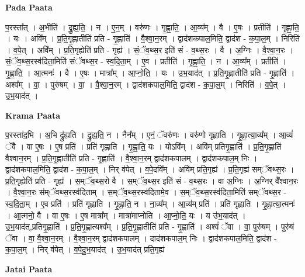 \documentclass[17pt]{extarticle}
\begin{document}
\textbf{Pada Paata} \newline

प॒रस्ता᳚त् । अ॒भीति॑ । द्रु॒ह्य॒ति॒ । न । ए॒न॒म् । वरु॑णः । गृ॒ह्णा॒ति॒ । आ॒व्य᳚म् । वै । ए॒षः । प्रतीति॑ । गृ॒ह्णा॒ति॒ । यः । अवि᳚म् । प्र॒ति॒गृ॒ह्णातीति॑ प्रति - गृ॒ह्णाति॑ । वै॒श्वा॒न॒रम् । द्वाद॑शकपाल॒मिति॒ द्वाद॑श - क॒पा॒ल॒म् । निरिति॑ । व॒पे॒त् । अवि᳚म् । प्र॒ति॒गृह्येति॑ प्रति - गृह्य॑ । सं॒ॅव॒थ्स॒र इति॑ सं - व॒थ्स॒रः । वै । अ॒ग्निः । वै॒श्वा॒न॒रः । सं॒ॅव॒थ्स॒रस्व॑दिता॒मिति॑ संॅवथ्स॒र - स्व॒दि॒ता॒म् । ए॒व । प्रतीति॑ । गृ॒ह्णा॒ति॒ । न । आ॒व्य᳚म् । प्रतीति॑ । गृ॒ह्णा॒ति॒ । आ॒त्मनः॑ । वै । ए॒षः । मात्रा᳚म् । आ॒प्नो॒ति॒ । यः । उ॒भ॒याद॑त् । प्र॒ति॒गृ॒ह्णातीति॑ प्रति - गृ॒ह्णाति॑ । अश्व᳚म् । वा॒ । पुरु॑षम् । वा॒ । वै॒श्वा॒न॒रम् । द्वाद॑शकपाल॒मिति॒ द्वाद॑श - क॒पा॒ल॒म् । निरिति॑ । व॒पे॒त् । उ॒भ॒याद॑त् ।  \newline


\textbf{Krama Paata} \newline

प॒रस्ता॑द॒भि । अ॒भि द्रु॑ह्यति । द्रु॒ह्य॒ति॒ न । नैन᳚म् । ए॒नं॒ ॅवरु॑णः । वरु॑णो गृह्णाति । गृ॒ह्णा॒त्या॒व्य᳚म् । आ॒व्यं॑ ॅवै । वा ए॒षः । ए॒ष प्रति॑ । प्रति॑ गृह्णाति । गृ॒ह्णा॒ति॒ यः । योऽवि᳚म् । अवि॑म् प्रतिगृ॒ह्णाति॑ । प्र॒ति॒गृ॒ह्णाति॑ वैश्वान॒रम् । प्र॒ति॒गृ॒ह्णातीति॑ प्रति - गृ॒ह्णाति॑ । वै॒श्वा॒न॒रम् द्वाद॑शकपालम् । द्वाद॑शकपाल॒म् निः । द्वाद॑शकपाल॒मिति॒ द्वाद॑श - क॒पा॒ल॒म् । निर् व॑पेत् । व॒पे॒दवि᳚म् । अवि॑म् प्रति॒गृह्य॑ । प्र॒ति॒गृह्य॑ सम्ॅवथ्स॒रः । प्र॒ति॒गृह्येति॑ प्रति - गृह्य॑ । स॒म्ॅव॒थ्स॒रो वै । स॒म्ॅव॒थ्स॒र इति॑ सं - व॒थ्स॒रः । वा अ॒ग्निः । अ॒ग्निर् वै᳚श्वान॒रः । वै॒श्वा॒न॒रः स॑म्ॅवथ्स॒रस्व॑दिताम् । स॒म्ॅव॒थ्स॒रस्व॑दितामे॒व । स॒म्ॅव॒थ्स॒रस्व॑दिता॒मिति॑ सम्ॅवथ्स॒र - स्व॒दि॒ता॒॒म् । ए॒व प्रति॑ । प्रति॑ गृह्णाति । गृ॒ह्णा॒ति॒ न । ना॒व्य᳚म् । आ॒व्य॑म् प्रति॑ । प्रति॑ गृह्णाति । गृ॒ह्णा॒त्या॒त्मनः॑ । आ॒त्मनो॒ वै । वा ए॒षः । ए॒ष मात्रा᳚म् । मात्रा॑माप्नोति । आ॒प्नो॒ति॒ यः । य उ॑भ॒याद॑त् । उ॒भ॒याद॑त्,प्रतिगृ॒ह्णाति॑ । प्र॒ति॒गृ॒ह्णात्यश्व᳚म् । प्र॒ति॒गृ॒ह्णातीति॑ प्रति - गृ॒ह्णाति॑ । अश्वं॑ ॅवा । वा॒ पुरु॑षम् । पुरु॑षं ॅवा । वा॒ वै॒श्वा॒न॒रम् । वै॒श्वा॒न॒रम् द्वाद॑शकपालम् । दाद॑शकपाल॒म् निः । द्वाद॑शकपाल॒मिति॒ द्वाद॑श - क॒पा॒ल॒म् । निर् व॑पेत् । व॒पे॒दु॒भ॒याद॑त् । उ॒भ॒याद॑त् प्रति॒गृह्य॑ \newline

\textbf{Jatai Paata} \newline
\end{document}
